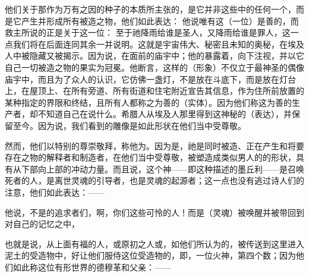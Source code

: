 他们关于那作为万有之因的种子的本质所主张的，是它并非这些中的任何一个，而是它产生并形成所有被造之物，他们如此表达： 他说唯有这（一位）是善的，而救主所说的正是关于这一位：  至于祂降雨给谁是圣人，又降雨给谁是罪人，这一点我们将在后面连同其余一并说明。这就是宇宙伟大、秘密且未知的奥秘，在埃及人中被隐藏又被揭示。因为说，在面前的庙宇中；他的暴露着，向下注视，并以它自己一切被造之物的果实为冠冕。他断言，这样的（形象）不仅立于最神圣的偶像庙宇中，而且为了众人的认识，它仿佛一盏灯，不是放在斗底下，而是放在灯台上，在屋顶上、在所有旁道、所有街道和住宅附近宣告其信息，作为住所前放置的某种指定的界限和终结，且所有人都称之为善的（实体）。因为他们称这为善的生产者，却不知道自己在说什么。希腊人从埃及人那里得到这神秘的（表达），并保留至今。因为说，我们看到的雕像是如此形状在他们当中受尊敬。\par

然而，他们以特别的尊崇敬拜，称他为。因为是，祂是同时被造、正在产生和将要存在之物的解释者和制造者，在他们当中受尊敬，被塑造成类似男人的的形状，具有从下部向上部的冲动力量。而且说，这个神——即这种描述的墨丘利——是召唤死者的人，是离世灵魂的引导者，也是灵魂的起源者；这一点也没有逃过诗人们的注意，他们如此表达：——\par

\par

他说，不是的追求者们，啊，你们这些可怜的人！而是（灵魂）被唤醒并被带回到对自己的记忆之中，\par

\par

也就是说，从上面有福的人，或原初之人或，如他们所认为的，被传送到这里进入泥土的受造物中，好让他们服侍这位受造物的，即，一位火神，第四个数；因为他们如此称这位有形世界的德穆革和父亲：——\par

